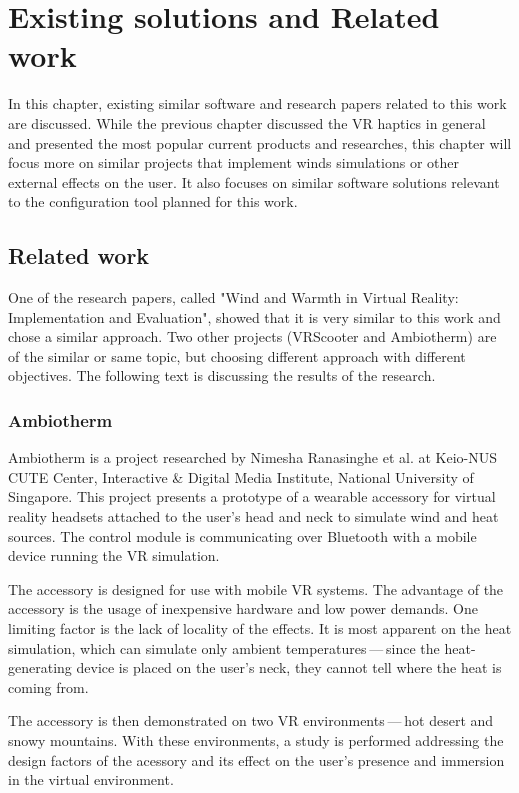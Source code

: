 \chapter{Existing solutions and Related work}

In this chapter, existing similar software and research papers related to this
work are discussed. While the previous chapter discussed the VR haptics in
general and presented the most popular current products and researches, this
chapter will focus more on similar projects that implement winds simulations
or other external effects on the user. It also focuses on similar software
solutions relevant to the configuration tool planned for this work.


\hypertarget{x-related-work}{\section{Related work}}
One of the research papers, called
"Wind and Warmth in Virtual Reality: Implementation and Evaluation",
showed that it is very similar to this work and chose a similar approach. Two
other projects (VRScooter and Ambiotherm) are of the similar or same topic,
but choosing different approach with different objectives.
The following text is discussing the results of the research.


\hypertarget{x-ambiotherm}{\subsection{Ambiotherm}}
Ambiotherm is a project researched by Nimesha Ranasinghe et al. at Keio-NUS
CUTE Center, Interactive \& Digital Media Institute, National University of
Singapore. This project presents a prototype of a wearable accessory for virtual
reality headsets attached to the user’s head and neck to simulate wind
and heat sources. The control module is communicating over Bluetooth with
a mobile device running the VR simulation.


The accessory is designed for use with mobile VR systems.
The advantage of the accessory is the usage of inexpensive hardware and low power
demands. One limiting factor is the lack of locality of the effects.
It is most apparent on the heat simulation, which can simulate
only ambient temperatures — since the heat-generating device is
placed on the user’s neck, they cannot tell where the heat is coming from.


The accessory is then demonstrated on two VR environments — hot desert and
snowy mountains. With these environments, a study is performed addressing the
design factors of the acessory and its effect on the user’s presence
and immersion in the virtual environment.


